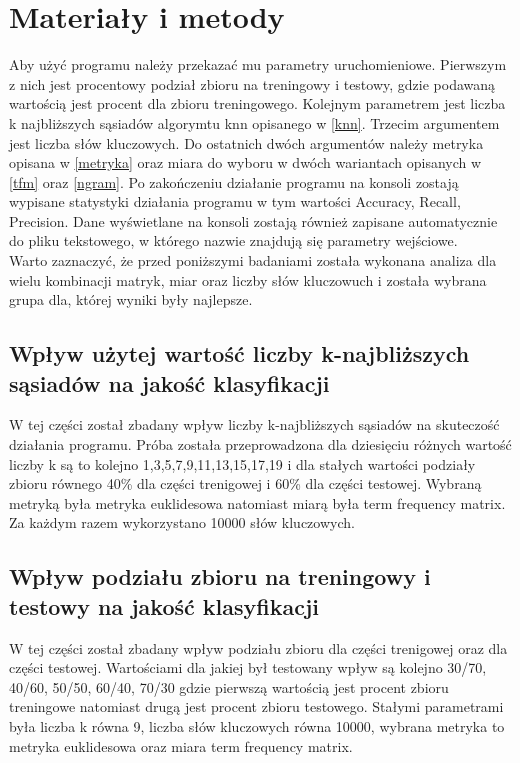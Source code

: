 \documentclass{classrep}
\begin{document}
    \section{Materiały i metody} \label{materialy} {
%
        Aby użyć programu należy przekazać mu parametry uruchomieniowe. Pierwszym z nich
        jest procentowy podział zbioru na treningowy i testowy, gdzie podawaną wartością
        jest procent dla zbioru treningowego. Kolejnym parametrem jest liczba k najbliższych
        sąsiadów algorymtu knn opisanego w \ref{knn}. Trzecim argumentem jest liczba słów kluczowych.
        Do ostatnich dwóch argumentów należy metryka opisana w \ref{metryka} oraz miara do wyboru w
        dwóch wariantach opisanych w \ref{tfm} oraz \ref{ngram}. Po zakończeniu działanie
        programu na konsoli zostają wypisane statystyki działania programu w tym wartości
        Accuracy, Recall, Precision. Dane wyświetlane na konsoli zostają również zapisane
        automatycznie do pliku tekstowego, w którego nazwie znajdują się parametry wejściowe.\\

        Warto zaznaczyć, że przed poniższymi badaniami została wykonana analiza dla wielu
        kombinacji matryk, miar oraz liczby słów kluczowuch i została wybrana grupa
        dla, której wyniki były najlepsze.

        \subsection{Wpływ użytej wartość liczby k-najbliższych sąsiadów na jakość klasyfikacji} {
            W tej części został zbadany wpływ liczby k-najbliższych sąsiadów na skuteczość
            działania programu. Próba została przeprowadzona dla dziesięciu różnych wartość
            liczby k są to kolejno 1,3,5,7,9,11,13,15,17,19 i dla stałych wartości
            podziały zbioru równego 40\% dla części trenigowej i 60\% dla części testowej.
            Wybraną metryką była metryka euklidesowa natomiast miarą była term frequency matrix.
            Za każdym razem wykorzystano 10000 słów kluczowych.
        }

        \subsection{Wpływ podziału zbioru na treningowy i testowy na jakość klasyfikacji} {
            W tej części został zbadany wpływ podziału zbioru dla części trenigowej
            oraz dla części testowej. Wartościami dla jakiej był testowany wpływ są
            kolejno 30/70, 40/60, 50/50, 60/40, 70/30 gdzie pierwszą wartością jest procent
            zbioru treningowe natomiast drugą jest procent zbioru testowego. Stałymi parametrami
            była liczba k równa 9, liczba słów kluczowych równa 10000, wybrana metryka to
            metryka euklidesowa oraz miara term frequency matrix.
        }

}
\end{document}
